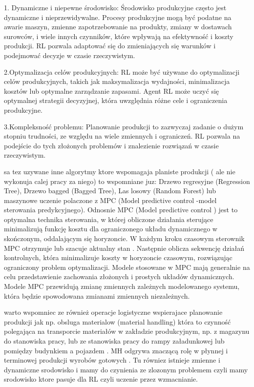     1. Dynamiczne i niepewne środowisko: Środowisko produkcyjne często jest dynamiczne i nieprzewidywalne. Procesy produkcyjne mogą być podatne na awarie maszyn, zmienne zapotrzebowanie na produkty, zmiany w dostawach surowców, i wiele innych czynników, które wpływają na efektywność i koszty produkcji. RL pozwala adaptować się do zmieniających się warunków i podejmować decyzje w czasie rzeczywistym.

    2.Optymalizacja celów produkcyjnych: RL może być używane do optymalizacji celów produkcyjnych, takich jak maksymalizacja wydajności, minimalizacja kosztów lub optymalne zarządzanie zapasami. Agent RL może uczyć się optymalnej strategii decyzyjnej, która uwzględnia różne cele i ograniczenia produkcyjne.

    3.Kompleksność problemu: Planowanie produkcji to zazwyczaj zadanie o dużym stopniu trudności, ze względu na wiele zmiennych i ograniczeń. RL pozwala na podejście do tych złożonych problemów i znalezienie rozwiązań w czasie rzeczywistym.


    sa tez uzywane inne algorytmy ktore wspomagaja planiste produkcji ( ale nie wykonuja calej pracy za niego) to wspomniane juz:  Drzewo regresyjne (Regression Tree), Drzewo bagged  (Bagged Tree), Las losowy (Random Forest) lub maszynowe uczenie polaczone z MPC (Model predictive control -model sterowania predykcyjnego). Odnosnie MPC (Model predictive control ) jest to  optymalna technika sterowania, w której obliczone działania sterujące minimalizują funkcję kosztu dla ograniczonego układu dynamicznego w skończonym, oddalającym się horyzoncie.
W każdym kroku czasowym sterownik MPC otrzymuje lub szacuje aktualny stan . Następnie oblicza sekwencję działań kontrolnych, która minimalizuje koszty w horyzoncie czasowym, rozwiązując ograniczony problem optymalizacji.  Modele stosowane w MPC mają generalnie na celu przedstawienie zachowania złożonych i prostych układów dynamicznych. Modele MPC przewidują zmianę zmiennych zależnych modelowanego systemu, która będzie spowodowana zmianami zmiennych niezależnych.
 
    warto wspomniec ze również operacje logistyczne wspierajace planowanie produkcji jak np. obsluga materialow (material handling) która to czynność polegająca na transporcie materiałów w zakładzie produkcyjnym, np. z magazynu do stanowiska pracy, lub ze stanowiska pracy do rampy załadunkowej lub pomiędzy budynkiem a pojazdem . MH  odgrywa znaczącą rolę w
płynnej i terminowej produkcji wyrobów gotowych . Tu równiez istnieje zmienne i  dynamiczne srodowisko i mamy do czynienia ze zlozonym problemem czyli mamy srodowisko ktore pasuje dla RL czyli uczenie przez wzmacnianie. 

